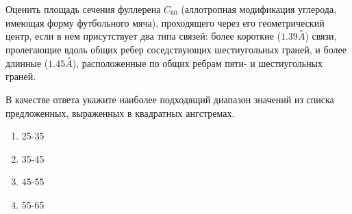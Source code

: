 
Оценить площадь сечения
фуллерена $C_{60}$ (аллотропная модификация углерода, имеющая форму футбольного
мяча), проходящего через его геометрический центр, если в нем присутствует два
типа связей: более короткие ($1.39 \stackrel{\circ}{A}$) связи, пролегающие вдоль общих ребер
соседствующих шестиугольных граней, и более длинные ($1.45 \stackrel{\circ}{A}$), расположенные по
общих ребрам пяти- и шестиугольных граней. 

В качестве ответа укажите наиболее подходящий диапазон значений из списка предложенных, выраженных в квадратных ангстремах.

\begin{enumerate}
    \item 25-35
    \item 35-45
    \item 45-55
    \item 55-65
\end{enumerate}


